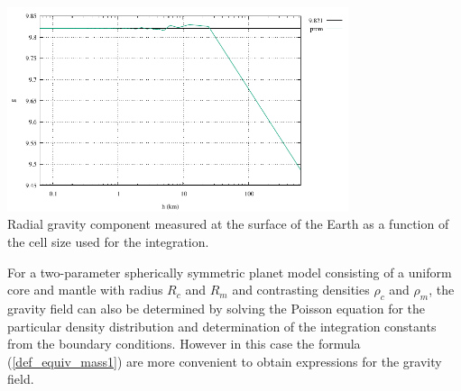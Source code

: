 \begin{center}
\includegraphics[width=10cm]{images/prem/g.pdf}\\
{\captionfont Radial gravity component measured at the surface
of the Earth as a function of the cell size used for the integration.}
\end{center}




\vspace{0.5cm}

\vspace{0.5cm}

For a two-parameter spherically symmetric planet model consisting of 
a uniform core and mantle with radius $R_c$ and $R_m$ 
and contrasting densities $\rho_c$ and $\rho_m$,
the gravity field can also be determined by solving the
Poisson equation for the particular density distribution and 
determination of the integration constants from the boundary conditions.
However in this case the formula (\ref{def_equiv_mass1}) are more
convenient to obtain expressions for the gravity field.

